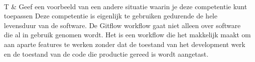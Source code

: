 \begin{tabu}
 \\ 
\hline
T & Geef een voorbeeld van een andere situatie waarin je deze competentie kunt toepassen
\newline
Deze competentie is eigenlijk te gebruiken gedurende de hele levensduur van de software. De Gitflow workflow gaat niet alleen over software die al in gebruik genomen wordt. Het is een workflow die het makkelijk maakt om aan aparte features te werken zonder dat de toestand van het development werk en de toestand van de code die productie gereed is wordt aangetast.
 \\ 
\hline
\end{tabu}